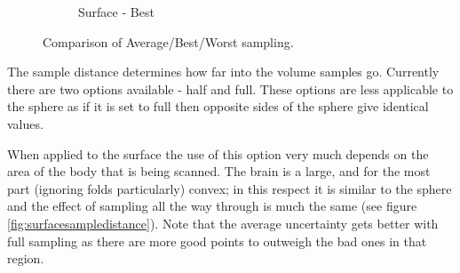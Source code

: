 \begin{figure}[H]
\begin{subfigure}[b]{0.32\textwidth}
    \caption*{Surface - Best}
    \label{fig:surfacebest}  
  \end{subfigure}  
  \caption{Comparison of Average/Best/Worst sampling.}\label{fig:surfaceaccumulator}
\end{figure}

The sample distance determines how far into the volume samples go. Currently there are two options available - half and full. These options are less applicable to the sphere as if it is set to full then opposite sides of the sphere give identical values.

When applied to the surface the use of this option very much depends on the area of the body that is being scanned. The brain is a large, and for the most part (ignoring folds particularly) convex; in this respect it is similar to the sphere and the effect of sampling all the way through is much the same (see figure \ref{fig:surfacesampledistance}). Note that the average uncertainty gets better with full sampling as there are more good points to outweigh the bad ones in that region.

